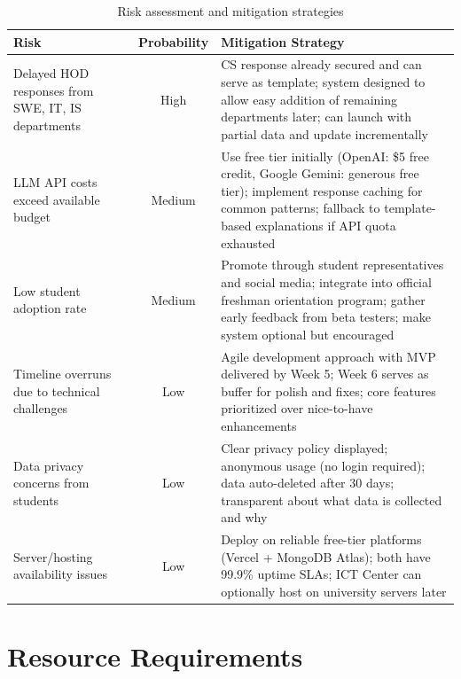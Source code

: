 \documentclass[12pt, a4paper]{article}
\begin{document}
\begin{table}[H]
\centering
\begin{tabularx}{\textwidth}{p{4.2cm}cX}
\toprule
\textbf{Risk} & \textbf{Probability} & \textbf{Mitigation Strategy} \\
\midrule
Delayed HOD responses from SWE, IT, IS departments & High & CS response already secured and can serve as template; system designed to allow easy addition of remaining departments later; can launch with partial data and update incrementally \\[8pt]

LLM API costs exceed available budget & Medium & Use free tier initially (OpenAI: \$5 free credit, Google Gemini: generous free tier); implement response caching for common patterns; fallback to template-based explanations if API quota exhausted \\[8pt]

Low student adoption rate & Medium & Promote through student representatives and social media; integrate into official freshman orientation program; gather early feedback from beta testers; make system optional but encouraged \\[8pt]

Timeline overruns due to technical challenges & Low & Agile development approach with MVP delivered by Week 5; Week 6 serves as buffer for polish and fixes; core features prioritized over nice-to-have enhancements \\[8pt]

Data privacy concerns from students & Low & Clear privacy policy displayed; anonymous usage (no login required); data auto-deleted after 30 days; transparent about what data is collected and why \\[8pt]

Server/hosting availability issues & Low & Deploy on reliable free-tier platforms (Vercel + MongoDB Atlas); both have 99.9\% uptime SLAs; ICT Center can optionally host on university servers later \\
\bottomrule
\end{tabularx}
\caption{Risk assessment and mitigation strategies}
\end{table}

\section{Resource Requirements}
\end{document}
